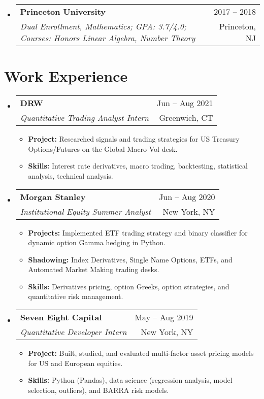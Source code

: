 \documentclass[letterpaper,11pt]{article}
\makeatletter
\newcommand{\resumeItem}[1]{
  \item\small{
    {#1 \vspace{-2pt}}
  }
}
\newcommand{\resumeSubheading}[4]{
  \vspace{-2pt}\item
    \begin{tabular*}{1.0\textwidth}[t]{l@{\extracolsep{\fill}}r}
      \textbf{#1} & {\small #2} \\
      \textit{\small#3} & {\small #4} \\
    \end{tabular*}\vspace{-7pt}
}
\newcommand{\resumeSubHeadingListStart}{\begin{itemize}[leftmargin=0.0in, label={}]}
\newcommand{\resumeSubHeadingListEnd}{\end{itemize}}
\newcommand{\resumeItemListStart}{\begin{itemize}}
\newcommand{\resumeItemListEnd}{\end{itemize}\vspace{-5pt}}
\makeatother
\begin{document}
  \resumeSubHeadingListStart
    \resumeSubheading
      {Princeton University}{2017 -- 2018}
      {Dual Enrollment, Mathematics; GPA: 3.7/4.0; Courses: Honors Linear Algebra, Number Theory}{Princeton, NJ}
  \resumeSubHeadingListEnd
  

\section{Work Experience}
  \resumeSubHeadingListStart

    \resumeSubheading
      {DRW}{Jun -- Aug 2021}
      {Quantitative Trading Analyst Intern}{Greenwich, CT}
      \resumeItemListStart
        \resumeItem{\textbf{Project:} Researched signals and trading strategies for US Treasury Options/Futures on the Global Macro Vol desk.}
        \resumeItem{\textbf{Skills:} Interest rate derivatives, macro trading, backtesting, statistical analysis, technical analysis.}
      \resumeItemListEnd

    \resumeSubheading
      {Morgan Stanley}{Jun -- Aug 2020}
      {Institutional Equity Summer Analyst}{New York, NY}
      \resumeItemListStart
        \resumeItem{\textbf{Projects:} Implemented ETF trading strategy and binary classifier for dynamic option Gamma hedging in Python.}
        \resumeItem{\textbf{Shadowing:} Index Derivatives, Single Name Options, ETFs, and Automated Market Making trading desks.}
        \resumeItem{\textbf{Skills:} Derivatives pricing, option Greeks, option strategies, and quantitative risk management.}
    \resumeItemListEnd
    
    \resumeSubheading
      {Seven Eight Capital}{May -- Aug 2019}
      {Quantitative Developer Intern}{New York, NY}
      \resumeItemListStart
        \resumeItem{\textbf{Project:} Built, studied, and evaluated multi-factor asset pricing models for US and European equities.}
        \resumeItem{\textbf{Skills:} Python (Pandas), data science (regression analysis, model selection, outliers), and BARRA risk models.}
      \resumeItemListEnd
    
  \resumeSubHeadingListEnd


\end{document}
